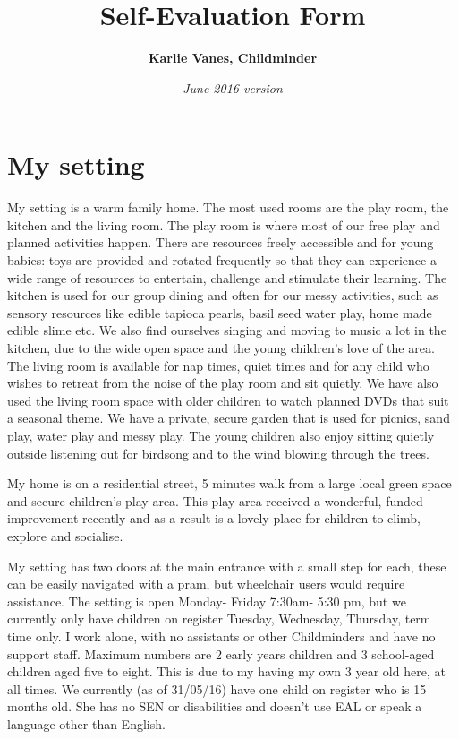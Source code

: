 \documentclass[10pt,a4paper]{report}
\title{\huge\bfseries\sffamily\color{MSBlue}Self-Evaluation Form}
\author{\Large\bfseries\sffamily\color{MSLightBlue}Karlie Vanes, Childminder}
\date{\itshape\subsectionfont June 2016 version}
\begin{document}
\maketitle

\tableofcontents

\chapter{My setting}

My setting is a warm family home. The most used rooms are the play room, the kitchen and the living room. The play room is where most of our free play and planned activities happen. There are  resources freely accessible and for young babies: toys are provided and rotated frequently so that they can experience a wide range of resources to entertain, challenge and stimulate their learning. The kitchen is used for our group dining and often for our messy activities, such as sensory resources like edible tapioca pearls, basil seed water play, home made edible slime etc. We also find ourselves singing and moving to music a lot in the kitchen, due to the wide open space and the young children's love of the area. The living room is available for nap times, quiet times and for any child who wishes to retreat from the noise of the play room and sit quietly. We have also used the living room space with older children to watch planned DVDs that suit a seasonal theme. We have a private, secure garden that is used for picnics, sand play, water play and messy play. The young children also enjoy sitting quietly outside listening out for birdsong and to the wind blowing through the trees. 

My home is on a residential street, 5 minutes walk from a large local green space and secure children's play area. This play area received a wonderful, funded improvement recently and as a result is a lovely place for children to climb, explore and socialise. 

My setting has two doors at the main entrance with a small step for each, these can be easily navigated with a pram, but wheelchair users would require assistance. The setting is open Monday- Friday 7:30am- 5:30 pm, but we currently only have children on register Tuesday, Wednesday, Thursday, term time only. I work alone, with no assistants or other Childminders and have no support staff. Maximum numbers are 2 early years children and 3 school-aged children aged five to eight. This is due to my having my own 3 year old here, at all times. We currently (as of 31/05/16) have one child on register who is 15 months old. She has no SEN or disabilities and doesn't use EAL or speak a language other than English. 
\end{document}

